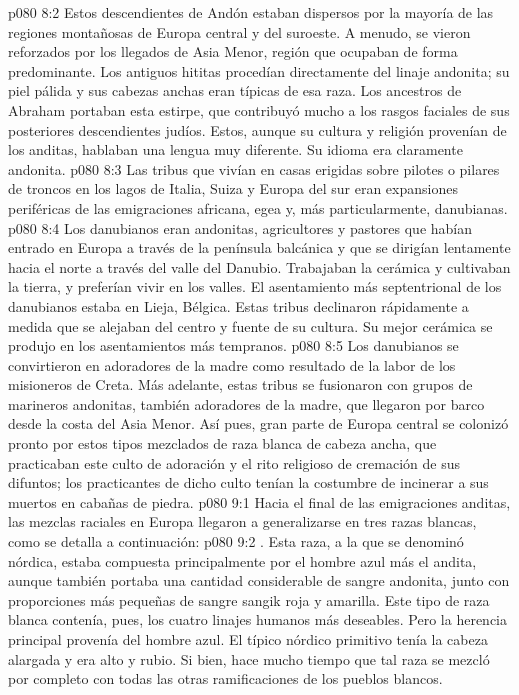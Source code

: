 \vs p080 8:2 Estos descendientes de Andón estaban dispersos por la mayoría de las regiones montañosas de Europa central y del suroeste. A menudo, se vieron reforzados por los llegados de Asia Menor, región que ocupaban de forma predominante. Los antiguos hititas procedían directamente del linaje andonita; su piel pálida y sus cabezas anchas eran típicas de esa raza. Los ancestros de Abraham portaban esta estirpe, que contribuyó mucho a los rasgos faciales de sus posteriores descendientes judíos. Estos, aunque su cultura y religión provenían de los anditas, hablaban una lengua muy diferente. Su idioma era claramente andonita.
\vs p080 8:3 Las tribus que vivían en casas erigidas sobre pilotes o pilares de troncos en los lagos de Italia, Suiza y Europa del sur eran expansiones periféricas de las emigraciones africana, egea y, más particularmente, danubianas.
\vs p080 8:4 Los danubianos eran andonitas, agricultores y pastores que habían entrado en Europa a través de la península balcánica y que se dirigían lentamente hacia el norte a través del valle del Danubio. Trabajaban la cerámica y cultivaban la tierra, y preferían vivir en los valles. El asentamiento más septentrional de los danubianos estaba en Lieja, Bélgica. Estas tribus declinaron rápidamente a medida que se alejaban del centro y fuente de su cultura. Su mejor cerámica se produjo en los asentamientos más tempranos.
\vs p080 8:5 Los danubianos se convirtieron en adoradores de la madre como resultado de la labor de los misioneros de Creta. Más adelante, estas tribus se fusionaron con grupos de marineros andonitas, también adoradores de la madre, que llegaron por barco desde la costa del Asia Menor. Así pues, gran parte de Europa central se colonizó pronto por estos tipos mezclados de raza blanca de cabeza ancha, que practicaban este culto de adoración y el rito religioso de cremación de sus difuntos; los practicantes de dicho culto tenían la costumbre de incinerar a sus muertos en cabañas de piedra.
\vs p080 9:1 Hacia el final de las emigraciones anditas, las mezclas raciales en Europa llegaron a generalizarse en tres razas blancas, como se detalla a continuación:
\vs p080 9:2 . Esta raza, a la que se denominó nórdica, estaba compuesta principalmente por el hombre azul más el andita, aunque también portaba una cantidad considerable de sangre andonita, junto con proporciones más pequeñas de sangre sangik roja y amarilla. Este tipo de raza blanca contenía, pues, los cuatro linajes humanos más deseables. Pero la herencia principal provenía del hombre azul. El típico nórdico primitivo tenía la cabeza alargada y era alto y rubio. Si bien, hace mucho tiempo que tal raza se mezcló por completo con todas las otras ramificaciones de los pueblos blancos.
